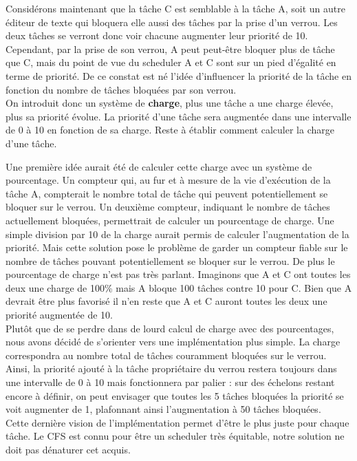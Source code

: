 Considérons maintenant que la tâche C est semblable à la tâche A, soit un autre éditeur de texte qui bloquera elle aussi des tâches par la prise d'un verrou. Les deux tâches se verront donc voir chacune augmenter leur priorité de 10. Cependant, par la prise de son verrou, A peut peut-être bloquer plus de tâche que C, mais du point de vue du scheduler A et C sont sur un pied d'égalité en terme de priorité. De ce constat est né l'idée d'influencer la priorité de la tâche en fonction du nombre de tâches bloquées par son verrou. 
\\

On introduit donc un système de \textbf{charge}, plus une tâche a une charge élevée, plus sa priorité évolue. La priorité d'une tâche sera augmentée dans une intervalle de 0 à 10 en fonction de sa charge. Reste à établir comment calculer la charge d'une tâche. 

Une première idée aurait été de calculer cette charge avec un système de pourcentage. Un compteur qui, au fur et à mesure de la vie d'exécution de la tâche A, compterait le nombre total de tâche qui peuvent potentiellement se bloquer sur le verrou. Un deuxième compteur, indiquant le nombre de tâches actuellement bloquées, permettrait de calculer un pourcentage de charge. Une simple division par 10 de la charge aurait permis de calculer l'augmentation de la priorité. Mais cette solution pose le problème de garder un compteur fiable sur le nombre de tâches pouvant potentiellement se bloquer sur le verrou. De plus le pourcentage de charge n'est pas très parlant. Imaginons que A et C ont toutes les deux une charge de 100\% mais A bloque 100 tâches contre 10 pour C. Bien que A devrait être plus favorisé il n'en reste que A et C auront toutes les deux une priorité augmentée de 10.
\\

Plutôt que de se perdre dans de lourd calcul de charge avec des pourcentages, nous avons décidé de s'orienter vers une implémentation plus simple. La charge correspondra au nombre total de tâches couramment bloquées sur le verrou. Ainsi, la priorité ajouté à la tâche propriétaire du verrou restera toujours dans une intervalle de 0 à 10 mais fonctionnera par palier : sur des échelons restant encore à définir, on peut envisager que toutes les 5 tâches bloquées la priorité se voit augmenter de 1, plafonnant ainsi l'augmentation à 50 tâches bloquées.
\\

Cette dernière vision de l'implémentation permet d'être le plus juste pour chaque tâche. Le CFS est connu pour être un scheduler très équitable, notre solution ne doit pas dénaturer cet acquis.

